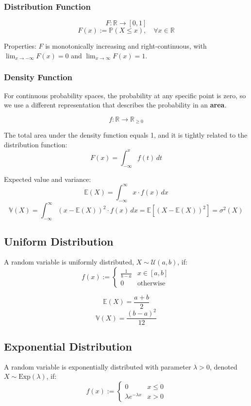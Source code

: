 \documentclass{article}
\begin{document}
\subsubsection{Distribution Function}
\[F: \mathbb{R} \to [0,1]\]
\[F(x) := \mathbb{P}(X\leq x), \quad \forall x \in \mathbb{R}\]

Properties: $F$ is monotonically increasing and right-continuous, with $\lim_{x \to -\infty} F(x) = 0$ and $\lim_{x \to \infty} F(x) = 1$.

\subsubsection{Density Function}
For continuous probability spaces, the probability at any specific point is zero, so we use a different representation that describes the probability in an \textbf{area}.

\[f: \mathbb{R} \to \mathbb{R}_{\geq 0}\]

The total area under the density function equals 1, and it is tightly related to the distribution function:
\[F(x) = \int_{-\infty}^{x} f(t)\,dt\]

Expected value and variance:
\[\mathbb{E}(X) = \int_{-\infty}^{\infty}x \cdot f(x)\,dx\]
\[\mathbb{V}(X) = \int_{-\infty}^{\infty}(x - \mathbb{E}(X))^2 \cdot f(x)\,dx = \mathbb{E}\left[(X - \mathbb{E}(X))^2\right] = \sigma^2(X)\]


\subsection{Uniform Distribution}
A random variable is uniformly distributed, $X \sim \mathcal{U}(a,b)$, if:
\[f(x) := \begin{cases}
    \frac{1}{b-a} & x \in [a,b] \\
    0 & \text{otherwise}
\end{cases}\]

\[\mathbb{E}(X) = \frac{a+b}{2}\]
\[\mathbb{V}(X) = \frac{(b-a)^2}{12}\]


\subsection{Exponential Distribution}
A random variable is exponentially distributed with parameter $\lambda > 0$, denoted $X \sim \text{Exp}(\lambda)$, if:
\[f(x) := \begin{cases}
    0 & x \leq 0 \\
    \lambda e^{-\lambda x} & x > 0
\end{cases}\]
\end{document}
